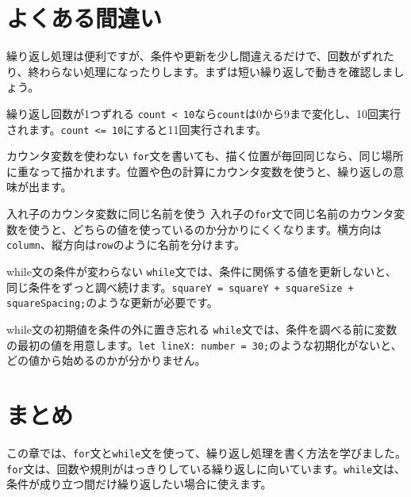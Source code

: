\section{よくある間違い}

繰り返し処理は便利ですが、条件や更新を少し間違えるだけで、回数がずれたり、終わらない処理になったりします。まずは短い繰り返しで動きを確認しましょう。

\begin{mistakebox}{繰り返し回数が1つずれる}
\texttt{count < 10}なら\texttt{count}は0から9まで変化し、10回実行されます。\texttt{count <= 10}にすると11回実行されます。
\end{mistakebox}

\begin{mistakebox}{カウンタ変数を使わない}
\texttt{for}文を書いても、描く位置が毎回同じなら、同じ場所に重なって描かれます。位置や色の計算にカウンタ変数を使うと、繰り返しの意味が出ます。
\end{mistakebox}

\begin{mistakebox}{入れ子のカウンタ変数に同じ名前を使う}
入れ子の\texttt{for}文で同じ名前のカウンタ変数を使うと、どちらの値を使っているのか分かりにくくなります。横方向は\texttt{column}、縦方向は\texttt{row}のように名前を分けます。
\end{mistakebox}

\begin{mistakebox}{while文の条件が変わらない}
\texttt{while}文では、条件に関係する値を更新しないと、同じ条件をずっと調べ続けます。\texttt{squareY = squareY + squareSize + squareSpacing;}のような更新が必要です。
\end{mistakebox}

\begin{mistakebox}{while文の初期値を条件の外に置き忘れる}
\texttt{while}文では、条件を調べる前に変数の最初の値を用意します。\texttt{let lineX: number = 30;}のような初期化がないと、どの値から始めるのかが分かりません。
\end{mistakebox}

\section{まとめ}

この章では、\texttt{for}文と\texttt{while}文を使って、繰り返し処理を書く方法を学びました。\texttt{for}文は、回数や規則がはっきりしている繰り返しに向いています。\texttt{while}文は、条件が成り立つ間だけ繰り返したい場合に使えます。

